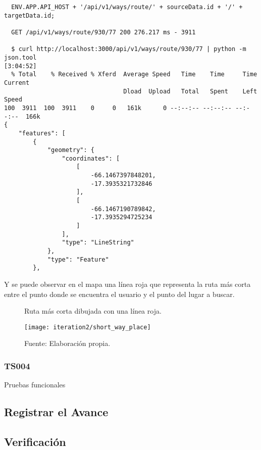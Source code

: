 \begin{verbatim}
  ENV.APP.API_HOST + '/api/v1/ways/route/' + sourceData.id + '/' + targetData.id;

  GET /api/v1/ways/route/930/77 200 276.217 ms - 3911

  $ curl http://localhost:3000/api/v1/ways/route/930/77 | python -m json.tool                                                       [3:04:52]
  % Total    % Received % Xferd  Average Speed   Time    Time     Time  Current
                                 Dload  Upload   Total   Spent    Left  Speed
100  3911  100  3911    0     0   161k      0 --:--:-- --:--:-- --:--:--  166k
{
    "features": [
        {
            "geometry": {
                "coordinates": [
                    [
                        -66.1467397848201,
                        -17.3935321732846
                    ],
                    [
                        -66.1467190789842,
                        -17.3935294725234
                    ]
                ],
                "type": "LineString"
            },
            "type": "Feature"
        },

\end{verbatim}

%

Y se puede observar en el mapa una línea roja que representa la ruta más corta entre el punto donde se encuentra el usuario y el punto del lugar a buscar.

\begin{figure}[H]
  \begin{center}
    \caption{Ruta más corta dibujada con una línea roja.}
    \label{fig:short_way_place}
    \texttt{[image: iteration2/short\_way\_place]}
    \caption*{Fuente: Elaboración propia.}
  \end{center}
\end{figure}

\subsubsection{TS004}
\label{subs:TS004}

Pruebas funcionales

\subsection{Registrar el Avance}
\label{sub:iteracion2_avance}

\subsection{Verificación}
\label{sub:iteracion2_verificacion}
